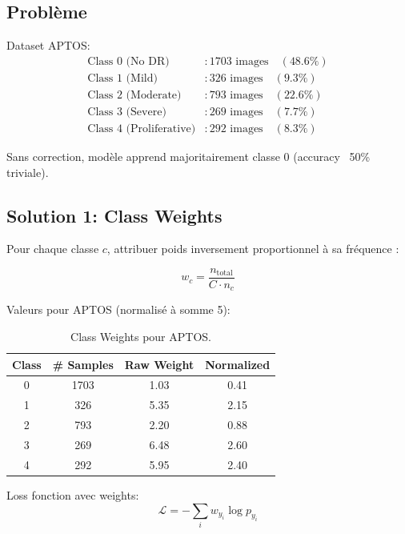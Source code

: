 \documentclass[12pt,a4paper,oneside]{report}
\begin{document}
\subsection{Problème}

Dataset APTOS:
\begin{align}
\text{Class 0 (No DR)} &: 1703 \text{ images} \quad (48.6\%) \\
\text{Class 1 (Mild)} &: 326 \text{ images} \quad (9.3\%) \\
\text{Class 2 (Moderate)} &: 793 \text{ images} \quad (22.6\%) \\
\text{Class 3 (Severe)} &: 269 \text{ images} \quad (7.7\%) \\
\text{Class 4 (Proliferative)} &: 292 \text{ images} \quad (8.3\%)
\end{align}

Sans correction, modèle apprend majoritairement classe 0 
(accuracy ~50\% triviale).

\subsection{Solution 1: Class Weights}

Pour chaque classe $c$, attribuer poids inversement proportionnel 
à sa fréquence :

\begin{equation}
w_c = \frac{n_{\text{total}}}{C \cdot n_c}
\label{eq:class_weights}
\end{equation}

Valeurs pour APTOS (normalisé à somme 5):

\begin{table}[H]
\centering
\begin{tabular}{|c|c|c|c|}
\hline
\textbf{Class} & \textbf{\# Samples} & \textbf{Raw Weight} & 
\textbf{Normalized} \\
\hline
0 & 1703 & 1.03 & 0.41 \\
1 & 326 & 5.35 & 2.15 \\
2 & 793 & 2.20 & 0.88 \\
3 & 269 & 6.48 & 2.60 \\
4 & 292 & 5.95 & 2.40 \\
\hline
\end{tabular}
\caption{Class Weights pour APTOS.}
\label{tab:class_weights}
\end{table}

Loss fonction avec weights:
\begin{equation}
\mathcal{L} = -\sum_i w_{y_i} \log p_{y_i}
\end{equation}
\end{document}
